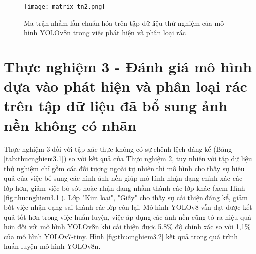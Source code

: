 \documentclass[../the.tex]{subfiles}
\begin{document}
\begin{figure}[H]
    \centering
    \texttt{[image: matrix\_tn2.png]}
    \caption{Ma trận nhầm lẫn chuẩn hóa trên tập dữ liệu thử nghiệm của mô hình YOLOv8n trong việc phát hiện và phân loại rác}
    \label{fig:thucnghiem2.1}
\end{figure}

\section{Thực nghiệm 3 - Đánh giá mô hình dựa vào phát hiện và phân loại rác trên tập dữ liệu đã bổ sung ảnh nền không có nhãn}
 {\fontsize{13}{12} \selectfont

  Thực nghiệm 3 đối với tập xác thực không có sự chênh lệch đáng kể (Bảng \ref{tab:thucnghiem3.1}) so với kết quả của Thực nghiệm 2, tuy nhiên với tập dữ liệu thử nghiệm chỉ gồm các đối tượng ngoài tự nhiên thì mô hình
  cho thấy sự hiệu quả của việc bổ sung các hình ảnh nền giúp mô hình nhận dạng chính xác các lớp hơn, giảm việc bỏ sót hoặc nhận dạng nhầm thành các lớp khác (xem Hình \ref{fig:thucnghiem3.1}).
  Lớp "Kim loại", "Giấy" cho thấy sự cải thiện đáng kể, giảm bớt việc nhận dạng sai thành các lớp còn lại.
  Mô hình YOLOv8 vẫn đạt được kết quả tốt hơn trong việc huấn luyện, việc áp dụng các ảnh nền cũng tỏ ra hiệu quả hơn đối với mô hình YOLOv8n khi cải thiện được 5.8\% độ chính xác so với 1,1\% của mô hình YOLOv7-tiny.
  Hình \ref{fig:thucnghiem3.2} kết quả trong quá trình huấn luyện mô hình YOLOv8n.

 }
\end{document}
